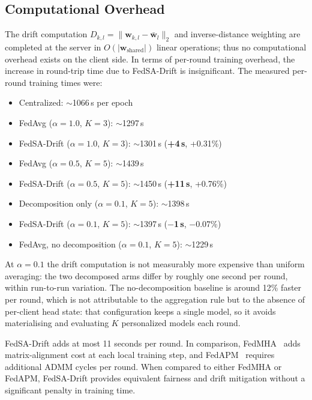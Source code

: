 \documentclass[utf8]{FrontiersinHarvard} %
\newcommand{\sadrift}{FedSA-Drift}
\begin{document}
\subsection{Computational Overhead}
\label{sec:computational_overhead}

The drift computation $D_{k,l} = \|\mathbf{w}_{k,l} - \bar{\mathbf{w}}_l\|_2$ and inverse-distance weighting are completed at the server in $O(|\mathbf{w}_{\text{shared}}|)$ linear operations; thus no computational overhead exists on the client side. In terms of per-round training overhead, the increase in round-trip time due to \sadrift{} is insignificant. The measured per-round training times were:

\begin{itemize}
    \item Centralized: $\sim$1066\,s per epoch
    \item FedAvg ($\alpha{=}1.0$, $K{=}3$): $\sim$1297\,s
    \item \sadrift{} ($\alpha{=}1.0$, $K{=}3$): $\sim$1301\,s (\textbf{+4\,s}, +0.31\%)
    \item FedAvg ($\alpha{=}0.5$, $K{=}5$): $\sim$1439\,s
    \item \sadrift{} ($\alpha{=}0.5$, $K{=}5$): $\sim$1450\,s (\textbf{+11\,s}, +0.76\%)
    \item Decomposition only ($\alpha{=}0.1$, $K{=}5$): $\sim$1398\,s
    \item \sadrift{} ($\alpha{=}0.1$, $K{=}5$): $\sim$1397\,s (\textbf{$-$1\,s}, $-$0.07\%)
    \item FedAvg, no decomposition ($\alpha{=}0.1$, $K{=}5$): $\sim$1229\,s
\end{itemize}

At $\alpha{=}0.1$ the drift computation is not measurably more expensive than uniform averaging: the two decomposed arms differ by roughly one second per round, within run-to-run variation. The no-decomposition baseline is around 12\% faster per round, which is not attributable to the aggregation rule but to the absence of per-client head state: that configuration keeps a single model, so it avoids materialising and evaluating $K$ personalized models each round.

\sadrift{} adds at most 11 seconds per round. In comparison, FedMHA~\citep{Darzi2024} adds matrix-alignment cost at each local training step, and FedAPM~\citep{Zhu2025} requires additional ADMM cycles per round. When compared to either FedMHA or FedAPM, \sadrift{} provides equivalent fairness and drift mitigation without a significant penalty in training time.
\end{document}
